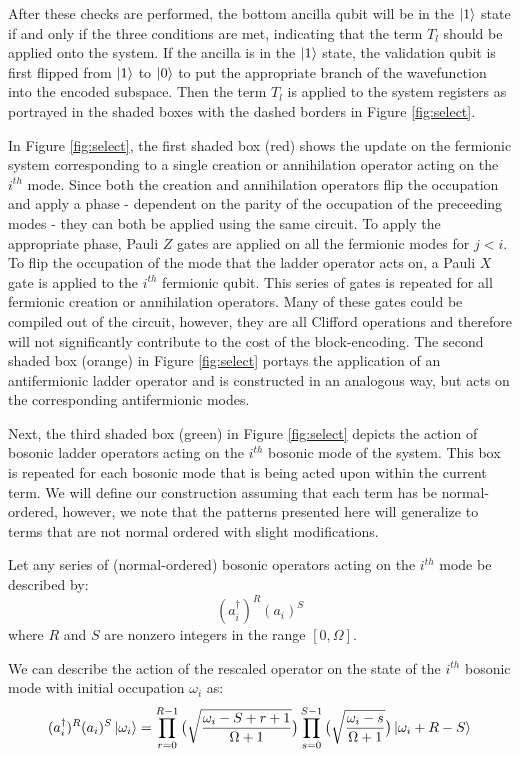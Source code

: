 After these checks are performed, the bottom ancilla qubit will be in the $\ket{1}$ state if and only if the three conditions are met, indicating that the term $T_l$ should be applied onto the system.
If the ancilla is in the $\ket{1}$ state, the validation qubit is first flipped from $\ket{1}$ to $\ket{0}$ to put the appropriate branch of the wavefunction into the encoded subspace.
Then the term $T_l$ is applied to the system registers as portrayed in the shaded boxes with the dashed borders in Figure \ref{fig:select}.

In Figure \ref{fig:select}, the first shaded box (red) shows the update on the fermionic system corresponding to a single creation or annihilation operator acting on the $i^{th}$ mode.
Since both the creation and annihilation operators flip the occupation and apply a phase - dependent on the parity of the occupation of the preceeding modes - they can both be applied using the same circuit.
To apply the appropriate phase, Pauli $Z$ gates are applied on all the fermionic modes for $j < i$.
To flip the occupation of the mode that the ladder operator acts on, a Pauli $X$ gate is applied to the $i^{th}$ fermionic qubit.
This series of gates is repeated for all fermionic creation or annihilation operators.
Many of these gates could be compiled out of the circuit, however, they are all Clifford operations and therefore will not significantly contribute to the cost of the block-encoding.
The second shaded box (orange) in Figure \ref{fig:select} portays the application of an antifermionic ladder operator and is constructed in an analogous way, but acts on the corresponding antifermionic modes.

Next, the third shaded box (green) in Figure \ref{fig:select} depicts the action of bosonic ladder operators acting on the $i^{th}$ bosonic mode of the system.
This box is repeated for each bosonic mode that is being acted upon within the current term.
We will define our construction assuming that each term has be normal-ordered, however, we note that the patterns presented here will generalize to terms that are not normal ordered with slight modifications.

Let any series of (normal-ordered) bosonic operators acting on the $i^{th}$ mode be described by:
\begin{equation}
    (a_i^\dagger)^R (a_i)^S
\end{equation}
where $R$ and $S$ are nonzero integers in the range $[0, \Omega]$.

We can describe the action of the rescaled operator on the state of the $i^{th}$ bosonic mode with initial occupation $\omega_i$ as:
\begin{equation}
    \label{eq:bosonic-operator-action}
    (a_i^\dagger)^R (a_i)^S \ket{\omega_i} = \prod_{r=0}^{R-1} \big( \sqrt{\frac{\omega_i - S + r + 1}{\Omega + 1}} \big) \prod_{s=0}^{S-1} \big( \sqrt{\frac{\omega_i - s}{\Omega + 1}} \big) \ket{\omega_i + R - S}
\end{equation}

